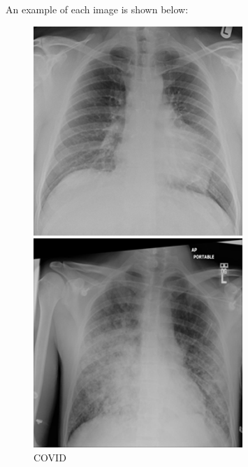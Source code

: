 \documentclass{article}
\begin{document}
An example of each image is shown below:
\begin{figure}[H]
    \centering
    \begin{minipage}[t]{0.24\textwidth}
        \centering
        \includegraphics[width=\linewidth]{COVID-1023.png}
        \caption{COVID}
        \label{fig:COVID-1023.png}
    \end{minipage}
    \hfill
    \begin{minipage}[t]{0.24\textwidth}
        \centering
        \includegraphics[width=\linewidth]{LungOpacity-1005.png}

\end{minipage}
\end{figure}
\end{document}
